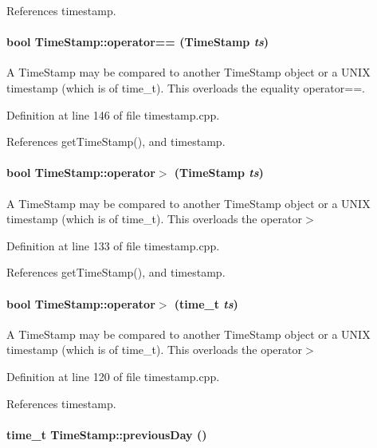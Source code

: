 References timestamp.\hypertarget{classTimeStamp_TimeStampa10}{
\paragraph[operator==]{\setlength{\rightskip}{0pt plus 5cm}bool Time\-Stamp::operator== (Time\-Stamp {\em ts})}\hfill}
\label{classTimeStamp_TimeStampa10}


A Time\-Stamp may be compared to another Time\-Stamp object or a UNIX timestamp (which is of time\_\-t). This overloads the equality operator==. 

Definition at line 146 of file timestamp.cpp.

References get\-Time\-Stamp(), and timestamp.\hypertarget{classTimeStamp_TimeStampa7}{
\paragraph[operator$>$]{\setlength{\rightskip}{0pt plus 5cm}bool Time\-Stamp::operator$>$ (Time\-Stamp {\em ts})}\hfill}
\label{classTimeStamp_TimeStampa7}


A Time\-Stamp may be compared to another Time\-Stamp object or a UNIX timestamp (which is of time\_\-t). This overloads the operator$>$ 

Definition at line 133 of file timestamp.cpp.

References get\-Time\-Stamp(), and timestamp.\hypertarget{classTimeStamp_TimeStampa6}{
\paragraph[operator$>$]{\setlength{\rightskip}{0pt plus 5cm}bool Time\-Stamp::operator$>$ (time\_\-t {\em ts})}\hfill}
\label{classTimeStamp_TimeStampa6}


A Time\-Stamp may be compared to another Time\-Stamp object or a UNIX timestamp (which is of time\_\-t). This overloads the operator$>$ 

Definition at line 120 of file timestamp.cpp.

References timestamp.\hypertarget{classTimeStamp_TimeStampa17}{
\paragraph[previousDay]{\setlength{\rightskip}{0pt plus 5cm}time\_\-t Time\-Stamp::previous\-Day ()}\hfill}
\label{classTimeStamp_TimeStampa17}


